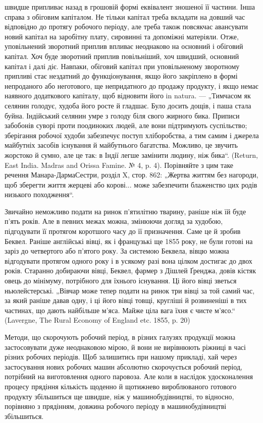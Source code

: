 \parcont{}  %
швидше припливає назад в грошовій формі еквівалент зношеної її частини.
Інша справа з обіговим капіталом. Не тільки капітал треба вкладати на
довший час відповідно до протягу робочого періоду, але треба також
повсякчас авансувати новий капітал на заробітну плату, сировинні та
допоміжні матеріяли. Отже, уповільнений зворотний приплив впливає
неоднаково на основний і обіговий капітал. Хоч буде зворотний приплив
повільніший, хоч швидший, основний капітал і далі діє. Навпаки, обіговий
капітал при уповільненому зворотному припливі стає нездатний до функціонування,
якщо його закріплено в формі непроданого або неготового,
ще непридатного до продажу продукту, і якщо немає наявного додаткового
капіталу, щоб відновити його in natura. — „Тимчасом як селянин
голодує, худоба його росте й гладшає. Було досить дощів, і паша стала
буйна. Індійський селянин умре з голоду біля свого жирного бика. Приписи
забобонів суворі проти поодиноких людей, але вони підтримують
суспільство; зберігання робочої худоби забезпечує поступ хліборобства,
а тим самим і джерела майбутніх засобів існування й майбутнього багатства.
Можливо, це звучить жорстоко й сумно, але це так: в Індії легше
замінити людину, ніж бика“. (Return, East India. Madras and Orissa
Famine. № 4, p. 4). Порівняйте з цим таке речення Манара-ДармаСестри,
розділ X, стор. 862: „Жертва життям без нагороди, щоб зберегти
життя жерцеві або корові... може забезпечити блаженство цих
родів низького походження“.

Звичайно неможливо подати на ринок п’ятилітню тварину, раніше
ніж їй буде п’ять років. Але в певних межах можна, змінюючи догляд
за худобою, підгодувати її протягом коротшого часу до її призначення.
Саме це й зробив Беквел. Раніше англійські вівці, як і французькі ще
1855 року, не були готові на заріз до четвертого або п’ятого року. За
системою Беквела, вівцю можна відгодувати протягом одного року і в
усякому разі вона цілком достигає до двох років. Старанно добираючи вівці,
Беквел, фармер з Дішлей Ґренджа, довів кістяк овець до мінімуму, потрібного
для їхнього існування. Ці його вівці зветься ньюлейстерські.
„Вівчар може тепер подати на ринок три вівці за той самий час, за який
раніше давав одну, і ці його вівці товщі, кругліші й розвиненіші
в тих частинах, що дають найбільше м’яса. Майже ціла вага їхня є чисте
м’ясо.“ (Lavergne, The Rural Economy of England etc. 1855, p. 20)

Методи, що скорочують робочий період, в різних галузях продукції
можна застосовувати дуже неоднаковою мірою, й вони не вирівнюють
ріжниці в часі різних робочих періодів. Щоб залишитись при нашому
прикладі, хай через застосування нових робочих машин абсолютно скорочується
робочий період, потрібний на виготовлення одного паровоза.
Але коли в наслідок удосконалення процесу прядіння кількість щоденно
й щотижнево вироблюваного готового продукту збільшиться ще швидше,
ніж у машинобудівництві, то відносно, порівняно з прядінням, довжина
робочого періоду в машинобудівництві збільшиться.
